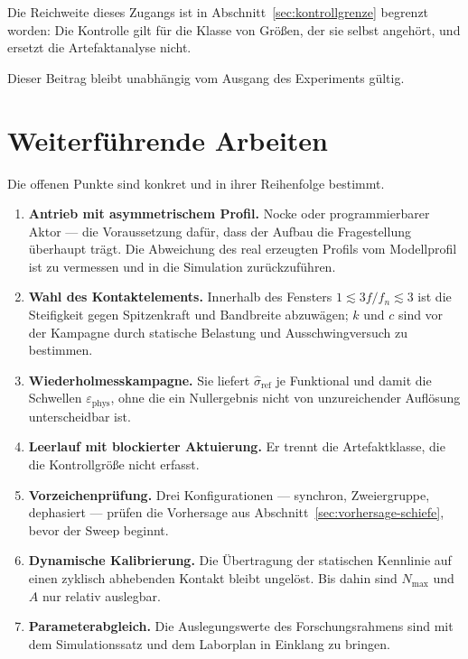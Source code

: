 \documentclass[12pt,a4paper]{report}
\begin{document}
Die Reichweite dieses Zugangs ist in
Abschnitt~\ref{sec:kontrollgrenze} begrenzt worden: Die Kontrolle gilt
für die Klasse von Größen, der sie selbst angehört, und ersetzt die
Artefaktanalyse nicht.

Dieser Beitrag bleibt unabhängig vom Ausgang des Experiments gültig.

\section{Weiterführende Arbeiten}

Die offenen Punkte sind konkret und in ihrer Reihenfolge bestimmt.

\begin{enumerate}
\item \textbf{Antrieb mit asymmetrischem Profil.} Nocke oder
      programmierbarer Aktor --- die Voraussetzung dafür, dass der Aufbau
      die Fragestellung überhaupt trägt. Die Abweichung des real
      erzeugten Profils vom Modellprofil ist zu vermessen und in die
      Simulation zurückzuführen.
\item \textbf{Wahl des Kontaktelements.} Innerhalb des Fensters
      $1 \lesssim 3f/f_n \lesssim 3$ ist die Steifigkeit gegen
      Spitzenkraft und Bandbreite abzuwägen; $k$ und $c$ sind vor der
      Kampagne durch statische Belastung und Ausschwingversuch zu
      bestimmen.
\item \textbf{Wiederholmesskampagne.} Sie liefert
      $\hat{\sigma}_{\mathrm{ref}}$ je Funktional und damit die
      Schwellen $\varepsilon_{\mathrm{phys}}$, ohne die ein Nullergebnis
      nicht von unzureichender Auflösung unterscheidbar ist.
\item \textbf{Leerlauf mit blockierter Aktuierung.} Er trennt die
      Artefaktklasse, die die Kontrollgröße nicht erfasst.
\item \textbf{Vorzeichenprüfung.} Drei Konfigurationen --- synchron,
      Zweiergruppe, dephasiert --- prüfen die Vorhersage aus
      Abschnitt~\ref{sec:vorhersage-schiefe}, bevor der Sweep beginnt.
\item \textbf{Dynamische Kalibrierung.} Die Übertragung der statischen
      Kennlinie auf einen zyklisch abhebenden Kontakt bleibt ungelöst.
      Bis dahin sind $N_{\max}$ und $A$ nur relativ auslegbar.
\item \textbf{Parameterabgleich.} Die Auslegungswerte des
      Forschungsrahmens sind mit dem Simulationssatz und dem Laborplan
      in Einklang zu bringen.
\end{enumerate}
\end{document}
